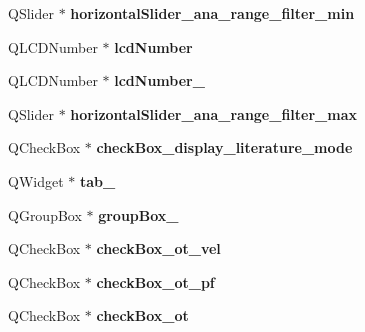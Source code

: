 \begin{DoxyCompactItemize}
\item 
\hypertarget{class_ui___main_window_ac6075c1c562a25c8a858ee58fc57c140}{}Q\+Slider $\ast$ {\bfseries horizontal\+Slider\+\_\+ana\+\_\+range\+\_\+filter\+\_\+min}\label{class_ui___main_window_ac6075c1c562a25c8a858ee58fc57c140}

\item 
\hypertarget{class_ui___main_window_aeaa664b636e02543a3047acb6d8918c5}{}Q\+L\+C\+D\+Number $\ast$ {\bfseries lcd\+Number}\label{class_ui___main_window_aeaa664b636e02543a3047acb6d8918c5}

\item 
\hypertarget{class_ui___main_window_aa58070a08b061548ea4b4ec9a45101f8}{}Q\+L\+C\+D\+Number $\ast$ {\bfseries lcd\+Number\+\_}\label{class_ui___main_window_aa58070a08b061548ea4b4ec9a45101f8}

\item 
\hypertarget{class_ui___main_window_a86b9e6ad43954d0e353e7c9c362c39b6}{}Q\+Slider $\ast$ {\bfseries horizontal\+Slider\+\_\+ana\+\_\+range\+\_\+filter\+\_\+max}\label{class_ui___main_window_a86b9e6ad43954d0e353e7c9c362c39b6}

\item 
\hypertarget{class_ui___main_window_abddd01ee40763254b283264c3d2cc992}{}Q\+Check\+Box $\ast$ {\bfseries check\+Box\+\_\+display\+\_\+literature\+\_\+mode}\label{class_ui___main_window_abddd01ee40763254b283264c3d2cc992}

\item 
\hypertarget{class_ui___main_window_a1c4b9067d74fe75d55c50bb96fee4061}{}Q\+Widget $\ast$ {\bfseries tab\+\_}\label{class_ui___main_window_a1c4b9067d74fe75d55c50bb96fee4061}

\item 
\hypertarget{class_ui___main_window_a320d3d7ba1cb8fff7b7b95923ed10f5e}{}Q\+Group\+Box $\ast$ {\bfseries group\+Box\+\_}\label{class_ui___main_window_a320d3d7ba1cb8fff7b7b95923ed10f5e}

\item 
\hypertarget{class_ui___main_window_a64f5277417ca42fc0714dc1cf9c4dabf}{}Q\+Check\+Box $\ast$ {\bfseries check\+Box\+\_\+ot\+\_\+vel}\label{class_ui___main_window_a64f5277417ca42fc0714dc1cf9c4dabf}

\item 
\hypertarget{class_ui___main_window_a45306e34db41100fe185b74d3cc6671c}{}Q\+Check\+Box $\ast$ {\bfseries check\+Box\+\_\+ot\+\_\+pf}\label{class_ui___main_window_a45306e34db41100fe185b74d3cc6671c}

\item 
\hypertarget{class_ui___main_window_a948ac79877648de63555370f7b27bcb9}{}Q\+Check\+Box $\ast$ {\bfseries check\+Box\+\_\+ot}\label{class_ui___main_window_a948ac79877648de63555370f7b27bcb9}


\end{DoxyCompactItemize}
